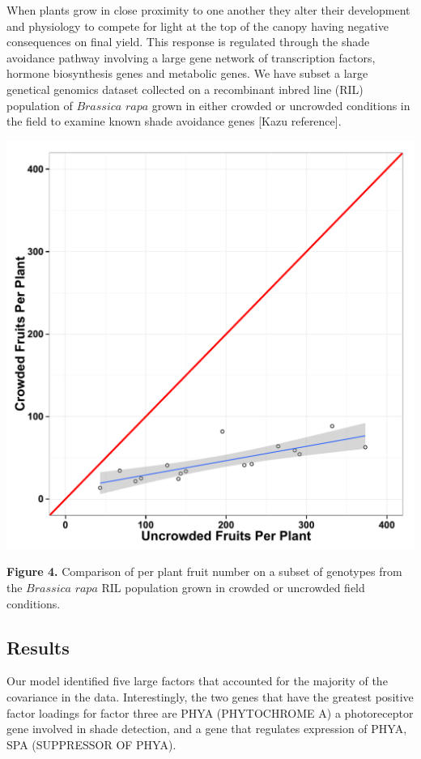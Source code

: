 \documentclass[landscape,paperwidth=48in,paperheight=36in,fontscale=0.35]{baposter}
\begin{document}
\begin{poster}
{\begin{multicols}{2}
When plants grow in close proximity to one another they alter their development and physiology to compete for light at the top of the canopy having negative consequences on final yield. This response is regulated through the shade avoidance pathway involving a large gene network of transcription factors, hormone biosynthesis genes and metabolic genes. We have subset a large genetical genomics dataset collected on a recombinant inbred line (RIL) population of $Brassica$  $rapa$ grown in either crowded or uncrowded conditions in the field to examine known shade avoidance genes [Kazu reference]. 
\newpage
\begin{center}
\includegraphics[width=1\columnwidth]{UN_CR_Fruit_regression.pdf} 
\end{center}
\textbf{Figure 4.} Comparison of per plant fruit number on a subset of genotypes from the $Brassica$  $rapa$ RIL population grown in crowded or uncrowded field conditions.
\end{multicols}

\subsection*{Results}

\begin{multicols}{2}
Our model identified five large factors that accounted for the majority of the covariance in the data. 
Interestingly, the two genes that have the greatest positive factor loadings for factor three are PHYA (PHYTOCHROME A) a photoreceptor gene involved in shade detection, and a gene that regulates expression of PHYA, SPA (SUPPRESSOR OF PHYA). 


\end{multicols}}
\end{poster}
\end{document}
